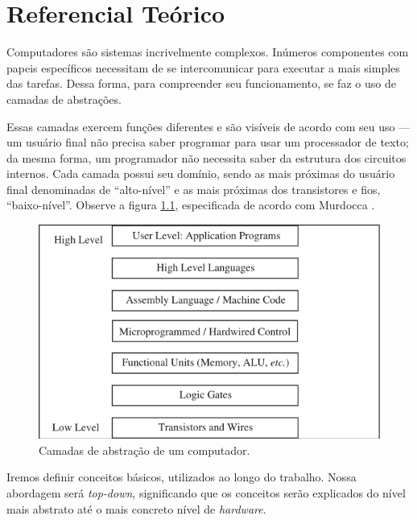 
\chapter{Referencial Teórico}


Computadores são sistemas incrivelmente complexos. Inúmeros componentes com
papeis específicos necessitam de se intercomunicar para executar a mais simples das
tarefas. Dessa forma, para compreender seu funcionamento, se faz o uso de
camadas de abstrações.

Essas camadas exercem funções diferentes e são visíveis de acordo com seu uso
--- um usuário final não precisa saber programar para usar um processador de
texto; da mesma forma, um programador não necessita saber da estrutura dos
circuitos internos. Cada camada possui seu domínio, sendo as mais próximas do
usuário final denominadas de ``alto-nível'' e as mais próximas dos transistores
e fios, ``baixo-nível''. Observe a figura \ref{camadas}, especificada de acordo
com Murdocca \cite{principles}.

\begin{figure}[ptb]
  \begin{center}
    \includegraphics[scale=.6]{imagens/1_camadas}
  \end{center}
  \caption{Camadas de abstração de um computador.}
  \label{camadas}
\end{figure}

Iremos definir conceitos básicos, utilizados ao longo do trabalho. Nossa abordagem
será \textit{top-down}, significando que os conceitos serão explicados do nível
mais abstrato até o mais concreto nível de \textit{hardware}.

